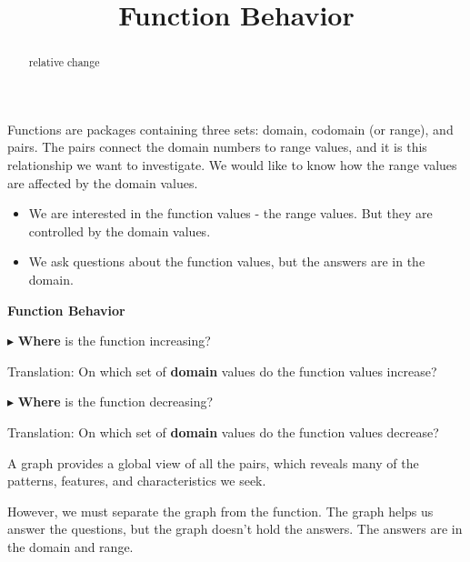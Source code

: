 \documentclass{ximera}
\title{Function Behavior}
\begin{document}
\begin{abstract}
relative change
\end{abstract}
\maketitle





Functions are packages containing three sets: domain, codomain (or range), and pairs.  The pairs connect the domain numbers to range values, and it is this relationship we want to investigate.   We would like to know how the range values are affected by the domain values.  



\begin{itemize}
\item We are interested in the function values - the range values.  But they are controlled by the domain values. 
\item We ask questions about the function values, but the answers are in the domain.
\end{itemize}




\begin{idea} \textbf{\textcolor{blue!55!black}{Function Behavior}} 

$\blacktriangleright$ \textbf{\textcolor{purple!85!blue}{Where}} is the function increasing? 

Translation: On which set of \textbf{\textcolor{purple!85!blue}{domain}} values do the function values increase? 


$\blacktriangleright$ \textbf{\textcolor{purple!85!blue}{Where}} is the function decreasing? 

Translation: On which set of \textbf{\textcolor{purple!85!blue}{domain}} values do the function values decrease? 


\end{idea}








A graph provides a global view of all the pairs, which reveals many of the patterns, features, and characteristics we seek.   

However, we must separate the graph from the function.  The graph helps us answer the questions, but the graph doesn't hold the answers.  The answers are in the domain and range. 
\end{document}
